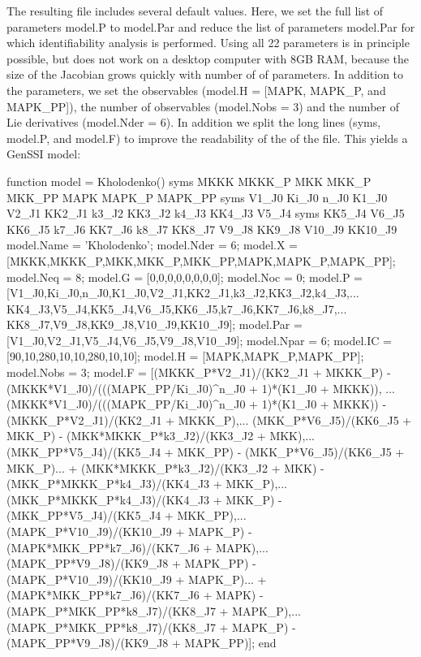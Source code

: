 The resulting file includes several default values. Here, we set the full list of parameters model.\+P to model.\+Par and reduce the list of parameters model.\+Par for which identifiability analysis is performed. Using all 22 parameters is in principle possible, but does not work on a desktop computer with 8\+GB R\+AM, because the size of the Jacobian grows quickly with number of of parameters. In addition to the parameters, we set the observables (model.\+H = \mbox{[}M\+A\+PK, M\+A\+P\+K\+\_\+P, and M\+A\+P\+K\+\_\+\+PP\mbox{]}), the number of observables (model.\+Nobs = 3) and the number of Lie derivatives (model.\+Nder = 6). In addition we split the long lines (syms, model.\+P, and model.\+F) to improve the readability of the of the file. This yields a Gen\+S\+SI model\+:


\begin{DoxyCode}
\textcolor{keyword}{function} model = Kholodenko()
    syms MKKK MKKK\_P MKK MKK\_P MKK\_PP MAPK MAPK\_P MAPK\_PP
    syms V1\_J0 Ki\_J0 n\_J0 K1\_J0 V2\_J1 KK2\_J1 k3\_J2 KK3\_J2 k4\_J3 KK4\_J3 V5\_J4
    syms KK5\_J4 V6\_J5 KK6\_J5 k7\_J6 KK7\_J6 k8\_J7 KK8\_J7 V9\_J8 KK9\_J8 V10\_J9 KK10\_J9
    model.Name = 'Kholodenko';
    model.Nder = 6;
    model.X = [MKKK,MKKK\_P,MKK,MKK\_P,MKK\_PP,MAPK,MAPK\_P,MAPK\_PP];
    model.Neq = 8;
    model.G = [0,0,0,0,0,0,0,0];
    model.Noc = 0;
    model.P = [V1\_J0,Ki\_J0,n\_J0,K1\_J0,V2\_J1,KK2\_J1,k3\_J2,KK3\_J2,k4\_J3,...
               KK4\_J3,V5\_J4,KK5\_J4,V6\_J5,KK6\_J5,k7\_J6,KK7\_J6,k8\_J7,...
               KK8\_J7,V9\_J8,KK9\_J8,V10\_J9,KK10\_J9];
    model.Par = [V1\_J0,V2\_J1,V5\_J4,V6\_J5,V9\_J8,V10\_J9];
    model.Npar = 6;
    model.IC = [90,10,280,10,10,280,10,10];
    model.H = [MAPK,MAPK\_P,MAPK\_PP];
    model.Nobs = 3;
    model.F = [(MKKK\_P*V2\_J1)/(KK2\_J1 + MKKK\_P) - (MKKK*V1\_J0)/(((MAPK\_PP/Ki\_J0)^n\_J0 + 1)*(K1\_J0 + MKKK)),
      ...
       (MKKK*V1\_J0)/(((MAPK\_PP/Ki\_J0)^n\_J0 + 1)*(K1\_J0 + MKKK)) - (MKKK\_P*V2\_J1)/(KK2\_J1 + MKKK\_P),...
       (MKK\_P*V6\_J5)/(KK6\_J5 + MKK\_P) - (MKK*MKKK\_P*k3\_J2)/(KK3\_J2 + MKK),...
       (MKK\_PP*V5\_J4)/(KK5\_J4 + MKK\_PP) - (MKK\_P*V6\_J5)/(KK6\_J5 + MKK\_P)...
           + (MKK*MKKK\_P*k3\_J2)/(KK3\_J2 + MKK) - (MKK\_P*MKKK\_P*k4\_J3)/(KK4\_J3 + MKK\_P),...
       (MKK\_P*MKKK\_P*k4\_J3)/(KK4\_J3 + MKK\_P) - (MKK\_PP*V5\_J4)/(KK5\_J4 + MKK\_PP),...
       (MAPK\_P*V10\_J9)/(KK10\_J9 + MAPK\_P) - (MAPK*MKK\_PP*k7\_J6)/(KK7\_J6 + MAPK),...
       (MAPK\_PP*V9\_J8)/(KK9\_J8 + MAPK\_PP) - (MAPK\_P*V10\_J9)/(KK10\_J9 + MAPK\_P)...
           + (MAPK*MKK\_PP*k7\_J6)/(KK7\_J6 + MAPK) - (MAPK\_P*MKK\_PP*k8\_J7)/(KK8\_J7 + MAPK\_P),...
       (MAPK\_P*MKK\_PP*k8\_J7)/(KK8\_J7 + MAPK\_P) - (MAPK\_PP*V9\_J8)/(KK9\_J8 + MAPK\_PP)];
end
\end{DoxyCode}


